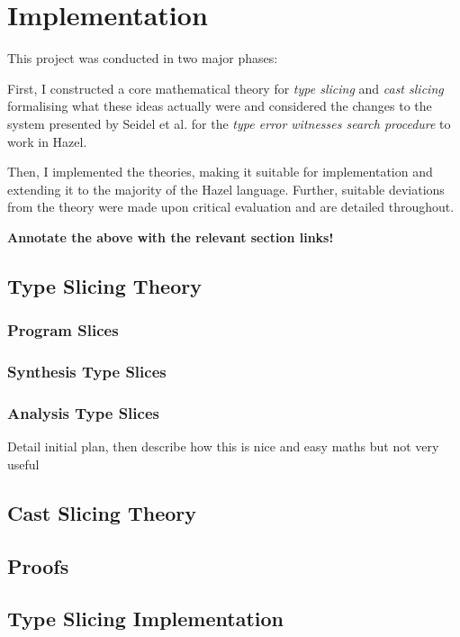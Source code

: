 \chapter{Implementation}\label{chap:Implementation}
This project was conducted in two major phases:

First, I constructed a core mathematical theory for \textit{type slicing} and \textit{cast slicing} formalising what these ideas actually were and considered the changes to the system presented by Seidel et al. for the \textit{type error witnesses search procedure} to work in Hazel.  

Then, I implemented the theories, making it suitable for implementation and extending it to the majority of the Hazel language. Further, suitable deviations from the theory were made upon critical evaluation and are detailed throughout.

\textbf{Annotate the above with the relevant section links!}
\section{Type Slicing Theory}\label{sec:TypeSlicingTheory}

\subsection{Program Slices}
\subsection{Synthesis Type Slices}\label{sec:SynthesisSlices}
\subsection{Analysis Type Slices}\label{sec:AnalysisSlices}
Detail initial plan, then describe how this is nice and easy maths but not very useful

\section{Cast Slicing Theory}\label{sec:CastSlicingTheory}

\section{Proofs}\label{sec:Proofs}

\section{Type Slicing Implementation}\label{sec:TypeSlicingImplementation}
